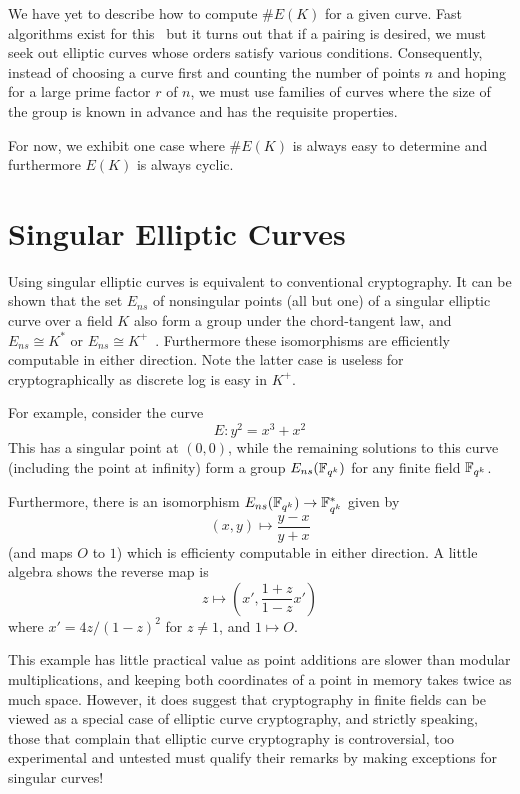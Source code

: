 We have yet to describe how to compute $\#E(K)$ for a given curve. Fast
algorithms exist for this~\cite{bss} but it turns out that if a pairing is
desired, we must seek out elliptic curves whose orders satisfy various
conditions. Consequently, instead of choosing a curve first and counting the
number of points $n$ and hoping for a large prime factor $r$ of $n$, we must
use families of curves where the size of the group is known in advance and has
the requisite properties.

For now, we exhibit one case where $\#E(K)$ is always easy to determine
and furthermore $E(K)$ is always cyclic.

\section {\label{sec:singular}Singular Elliptic Curves}

Using singular elliptic curves is equivalent to conventional cryptography.
It can be shown that the set $E_{ns}$ of nonsingular points (all but one) of a
singular elliptic curve over a field $K$ also form a group under the
chord-tangent law, and $E_{ns} \cong K^*$ or
$E_{ns} \cong K^+$~\cite[Proposition 2.5]{silverman}. Furthermore these
isomorphisms are efficiently computable in either direction. Note the latter
case is useless for cryptographically as discrete log is easy in $K^+$.

For example, consider the curve
\[ E : y^2 = x^3 + x^2 \]
This has a singular point at $(0,0)$, while the remaining solutions to this
curve (including the point at infinity) form a group $E_{ns}(\mathbb{F}_{q^k})$ for any
finite field $\mathbb{F}_{q^k}$.

Furthermore, there is an isomorphism $E_{ns}(\mathbb{F}_{q^k}) \rightarrow \mathbb{F}_{q^k}^*$
given by
\[ (x,y) \mapsto \frac{y-x}{y+x} \]
(and maps $O$ to $1$)
which is efficienty computable in either direction.
A little algebra
shows the reverse map is
\[ z \mapsto \left( x', \frac{1+z}{1-z} x' \right) \]
where $x' = 4z/(1-z)^2$ for $z \ne 1$, and $1 \mapsto O$.

This example has little practical value as point additions are slower than
modular multiplications, and keeping both coordinates of a point in memory
takes twice as much space. However, it does suggest that cryptography in finite
fields can be viewed as a special case of elliptic curve cryptography, and
strictly speaking, those that complain that elliptic curve cryptography is
controversial, too experimental and untested must qualify their remarks by
making exceptions for singular curves!

